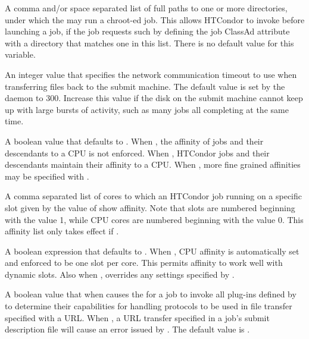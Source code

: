 \begin{description}
\label{param:NamedChroot} 
\item[\Macro{NAMED\_CHROOT}]
  A comma and/or space separated list of full paths to one or more directories,
  under which the  may run a chroot-ed job.
  This allows HTCondor to invoke  before launching a job,
  if the job requests such by defining the job ClassAd attribute
   with a directory that matches one in this list.
  There is no default value for this variable.

\label{param:StarterUploadTimeout} 
\item[\Macro{STARTER\_UPLOAD\_TIMEOUT}]
  An integer value that specifies the network communication timeout to use
  when transferring files back to the submit machine.  The default value is
  set by the  daemon to 300.
  Increase this value if the disk on the submit machine
  cannot keep up with large bursts of activity, such as many jobs all
  completing at the same time.

\label{param:EnforceCpuAffinity} 
\item[\Macro{ENFORCE\_CPU\_AFFINITY}]
  A boolean value that defaults to .  When ,
  the affinity of jobs and their descendants to a CPU is not enforced.
  When , HTCondor jobs and their descendants maintain their
  affinity to a CPU.
  When , more fine grained affinities may be specified with
  .

\label{param:SlotNCpuAffinity} 
\item[\Macro{SLOT<N>\_CPU\_AFFINITY}]
  A comma separated list of cores to which an HTCondor job running on
  a specific slot given by the value of  show affinity.
  Note that slots are numbered beginning with the value 1,
  while CPU cores are numbered beginning with the value 0.
  This affinity list only takes effect if
  .

\label{param:AssignCpuAffinity} 
\item[\Macro{ASSIGN\_CPU\_AFFINITY}]
  A boolean expression that defaults to .
  When ,
  CPU affinity is automatically set and enforced to be one slot per core.
  This permits affinity to work well with dynamic slots. 
  Also when , overrides any settings specified by
  .

\label{param:EnableURLTransfers} 
\item[\Macro{ENABLE\_URL\_TRANSFERS}]
  A boolean value that when  causes the  for
  a job to invoke all plug-ins defined by 
  to determine their capabilities for handling protocols to be
  used in file transfer specified with a URL.
  When , a URL transfer specified in a job's submit description
  file will cause an error issued by .
  The default value is .


\end{description}
